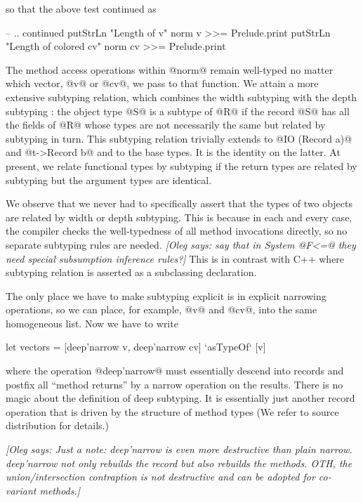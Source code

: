 \documentclass{jfp}
\newcommand{\oleg}[1]{{\it [Oleg says: #1]}}
\begin{document}
so that the above test continued as
\begin{code}
        -- .. continued
	putStrLn "Length of v"
        norm v >>= Prelude.print
	putStrLn "Length of colored cv"
        norm cv >>= Prelude.print
\end{code}
The method access operations within @norm@ remain well-typed no matter
which vector, @v@ or @cv@, we pass to that function.  We attain a
more extensive subtyping relation, which combines the width subtyping
with the depth subtyping \cite{Poll97}: the object type @S@ is a
subtype of @R@ if the record @S@ has all the fields of @R@ whose types
are not necessarily the same but related by subtyping in turn. This
subtyping relation trivially extends to @IO (Record a)@ and 
@t->Record b@ and to the base types. It is the identity on the latter. At
present, we relate functional types by subtyping if the return types
are related by subtyping but the argument types are identical.

We observe that we never had to specifically assert that the types of
two objects are related by width or depth subtyping. This is because
in each and every case, the compiler checks the well-typedness of all
method invocations directly, so no separate subtyping rules are
needed. \oleg{say that in System @F<=@ they need special subsumption
  inference rules?} This is in contrast with C++ where subtyping
relation is asserted as a subclassing declaration.

The only place we have to make subtyping explicit is in explicit
narrowing operations, so we can place, for example, @v@ and @cv@,
into the same homogeneous list. Now we have to write
\begin{code}
	let vectors = [deep'narrow v, deep'narrow cv]
		      `asTypeOf` [v]
\end{code}
where the operation @deep'narrow@ must essentially descend into records and
postfix all ``method returns'' by a narrow operation on the results.
There is no magic about the definition of deep subtyping. It is
essentially just another record operation that is driven by the
structure of method types (We refer to source distribution for
details.)

\oleg{Just a note: deep'narrow is even more destructive than plain
  narrow. deep'narrow not only rebuilds the record but also rebuilds
  the methods. OTH, the union/intersection contraption is not
  destructive and can be adopted for co-variant methods.}
\end{document}
